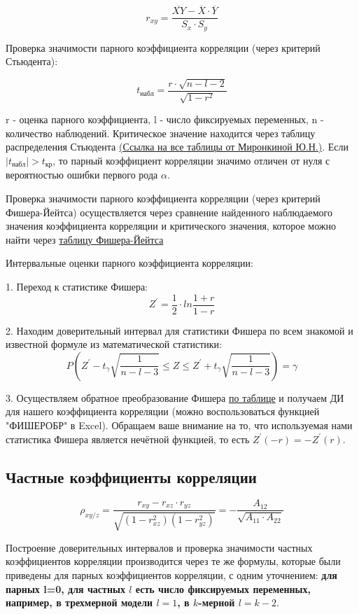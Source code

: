 \documentclass[a4paper,12pt]{article} %
\begin{document}
\[r_{xy}=\frac{\overline{XY}-\overline{X}\cdot\overline{Y}}{S_x \cdot S_y}\]

Проверка значимости парного коэффициента корреляции (через критерий Стьюдента):

\[ t_{набл}=\frac{r\cdot\sqrt{n-l-2}}{\sqrt{1-r^2}}\]

r - оценка парного коэффициента, l - число фиксируемых переменных, n - количество наблюдений. Критическое значение находится через таблицу распределения Стьюдента \href{https://github.com/Shred27/MSM/blob/main/Table_of_distributions_Mironkina.pdf}{(Ссылка на все таблицы от Миронкиной Ю.Н.)}. Если $|t_{набл}|>t_{кр}$, то парный коэффициент корреляции значимо отличен от нуля с вероятностью ошибки первого рода $\alpha$.

Проверка значимости парного коэффициента корреляции (через критерий Фишера-Йейтса) осуществляется через сравнение найденного наблюдаемого значения коэффициента корреляции и критического значения, которое можно найти через \href{https://studfile.net/preview/1720882/}{таблицу Фишера-Йейтса}



Интервальные оценки парного коэффициента корреляции:

1. Переход к статистике Фишера:
\[Z^{'}=\frac{1}{2}\cdot ln\frac{1+r}{1-r}\]

2. Находим доверительный интервал для статистики Фишера по всем знакомой и известной формуле из математической статистики:
\[P\left(Z^{'}-t_{\gamma}\sqrt{\frac{1}{n-l-3}}\le Z \le Z^{'}+t_{\gamma}\sqrt{\frac{1}{n-l-3}}\right)=\gamma\]

3. Осуществляем обратное преобразование Фишера \href{http://smc.edu.nstu.ru/preobf.htm}{по таблице} и получаем ДИ для нашего коэффициента корреляции (можно воспользоваться функцией "ФИШЕРОБР" в Excel). Обращаем ваше внимание на то, что используемая нами статистика Фишера является нечётной функцией, то есть $Z^{'}(-r)=-Z^{'}(r)$.
\subsection{Частные коэффициенты корреляции}

\[\rho_{xy/z}=\frac{r_{xy}-r_{xz}\cdot r_{yz}}{\sqrt{(1-r_{xz}^2)(1-r_{yz}^2)}}=-\frac{A_{12}}{\sqrt{A_{11}\cdot A_{22}}}\]

Построение доверительных интервалов и проверка значимости частных коэффициентов корреляции производится через те же формулы, которые были приведены для парных коэффициентов корреляции, с одним уточнением: \textbf{для парных l=0, для частных $l$ есть число фиксируемых переменных, например, в трехмерной модели $l=1$, в $k$-мерной $l=k-2$}.
\end{document}
